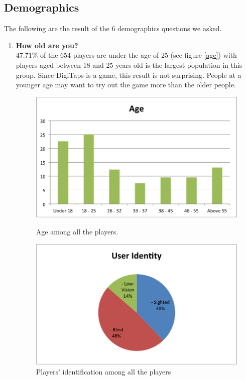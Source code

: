 \subsection{Demographics}
The following are the result of the 6 demographics questions we asked.
\begin{enumerate}
  \item \textbf{How old are you?} \\
  47.71\% of the 654 players are under the age of 25 (see figure \ref{age}) with players aged between 18 and 25 years old is the largest population in this group. Since DigiTaps is a game, this result is not surprising. People at a younger age may want to try out the game more than the older people.

\begin{figure}[!htbp]
  \centering
  \includegraphics[width=1.0\textwidth]{figures/chart-age.png}
  \caption{Age among all the players.}
  \label{age}
  \includegraphics[width=1.0\textwidth]{figures/chart-identity.png}
  \caption{Players' identification among all the players}
  \label{identity}
\end{figure}


\end{enumerate}
